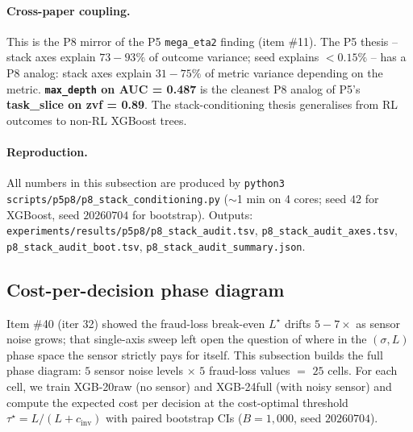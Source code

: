 \paragraph{Cross-paper coupling.}
This is the P8 mirror of the P5 \texttt{mega\_eta2} finding
(item \#11). The P5 thesis -- stack axes explain $73{-}93\%$ of outcome
variance; seed explains $<0.15\%$ -- has a P8 analog: stack axes explain
$31{-}75\%$ of metric variance depending on the metric.
\textbf{\texttt{max\_depth} on AUC = 0.487} is the cleanest P8 analog of
P5's \textbf{task\_slice on zvf = 0.89}. The stack-conditioning thesis
generalises from RL outcomes to non-RL XGBoost trees.

\paragraph{Reproduction.} All numbers in this subsection are produced
by \texttt{python3 scripts/p5p8/p8\_stack\_conditioning.py} ($\sim$1 min
on 4 cores; seed $42$ for XGBoost, seed $20260704$ for bootstrap).
Outputs:
\texttt{experiments/results/p5p8/p8\_stack\_audit.tsv},
\texttt{p8\_stack\_audit\_axes.tsv},
\texttt{p8\_stack\_audit\_boot.tsv},
\texttt{p8\_stack\_audit\_summary.json}.

\subsection{Cost-per-decision phase diagram}

Item \#40 (iter 32) showed the fraud-loss break-even $L^\star$ drifts
$5{-}7\times$ as sensor noise grows; that single-axis sweep left open the
question of where in the $(\sigma, L)$ phase space the sensor strictly
pays for itself. This subsection builds the full phase diagram:
$5$ sensor noise levels $\times$ $5$ fraud-loss values $=$ $25$ cells.
For each cell, we train XGB-20raw (no sensor) and XGB-24full (with
noisy sensor) and compute the expected cost per decision at the
cost-optimal threshold $\tau^\star = L / (L + c_\text{inv})$ with paired
bootstrap CIs ($B{=}1{,}000$, seed $20260704$).

